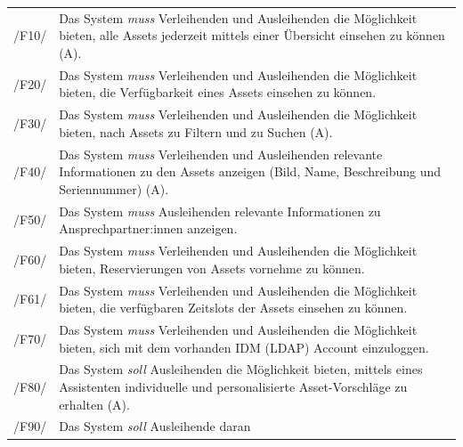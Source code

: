 \begin{center}
        \renewcommand{\arraystretch}{1.5}
        \begin{longtable}{lp{}} \arrayrulecolor{maincolor}\hline
                 \sffamily\color{maincolor}/F10/  & Das System \textit{muss} Verleihenden und
                Ausleihenden die Möglichkeit bieten, alle Assets jederzeit mittels einer
                Übersicht einsehen zu können (A). \\
                 \sffamily\color{maincolor}/F20/  & Das System \textit{muss}  Verleihenden und
                 Ausleihenden die Möglichkeit bieten, die Verfügbarkeit eines Assets einsehen zu
                 können. \\
                 \sffamily\color{maincolor}/F30/  & Das System \textit{muss} Verleihenden und
                 Ausleihenden die Möglichkeit bieten, nach Assets zu Filtern und zu Suchen (A). \\
                 \sffamily\color{maincolor}/F40/  & Das System \textit{muss}  Verleihenden und
                Ausleihenden relevante Informationen zu den Assets anzeigen (Bild, Name,
                Beschreibung und Seriennummer) (A). \\
                 \sffamily\color{maincolor}/F50/  & Das System \textit{muss}  Ausleihenden relevante
                 Informationen zu Ansprechpartner:innen anzeigen. \\
                 \sffamily\color{maincolor}/F60/  & Das System \textit{muss} Verleihenden und
                 Ausleihenden die Möglichkeit bieten, Reservierungen von Assets vornehme zu können.
                 \\
                 \sffamily\color{maincolor}/F61/  & Das System \textit{muss} Verleihenden und
                 Ausleihenden die Möglichkeit bieten, die verfügbaren Zeitslots der Assets einsehen
                 zu können. \\
                 \sffamily\color{maincolor}/F70/  & Das System \textit{muss} Verleihenden und
                 Ausleihenden die Möglichkeit bieten, sich mit dem vorhanden IDM (LDAP) Account
                 einzuloggen. \\
                 \sffamily\color{maincolor}/F80/  & Das System \textit{soll} Ausleihenden die
                Möglichkeit bieten, mittels eines Assistenten individuelle und personalisierte
                Asset-Vorschläge zu erhalten (A). \\
                 \sffamily\color{maincolor}/F90/  & Das System \textit{soll} Ausleihende daran

\end{longtable}
\end{center}
